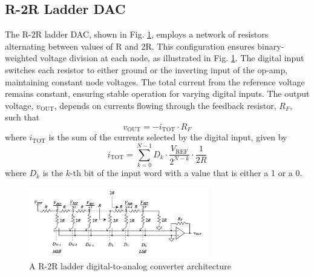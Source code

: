 \subsection{R-2R Ladder DAC}
The R-2R ladder DAC, shown in Fig. \ref{fig:r2r_dac}, employs a network of resistors alternating between values of R and 2R. This configuration ensures binary-weighted voltage division at each node, as illustrated in Fig. \ref{fig:r2r_dac}. The digital input switches each resistor to either ground or the inverting input of the op-amp, maintaining constant node voltages. The total current from the reference voltage remains constant, ensuring stable operation for varying digital inputs.
The output voltage, $v_{\text{OUT}}$, depends on currents flowing through the feedback resistor, $R_F$, such that
\begin{equation}
v_{\text{OUT}} = -i_{\text{TOT}} \cdot R_F \tag{29.14}
\end{equation}
where $i_{\text{TOT}}$ is the sum of the currents selected by the digital input, given by
\begin{equation}
i_{\text{TOT}} = \sum_{k=0}^{N-1} D_k \cdot \frac{V_{\text{REF}}}{2^{N-k}} \cdot \frac{1}{2R} \tag{29.15}
\end{equation}
where $D_k$ is the $k$-th bit of the input word with a value that is either a 1 or a 0.
\begin{figure}
	\centering
	\includegraphics[width=0.7\textwidth]{figs/r2r_dac.png}
	\caption{A R-2R ladder digital-to-analog converter architecture}
	\label{fig:r2r_dac}
	\vspace{0.5cm}
\end{figure}
